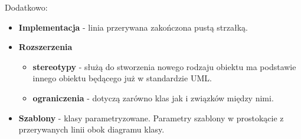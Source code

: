 \documentclass[../main.tex]{subfiles}
\begin{document}
    Dodatkowo:
    \begin{itemize}
        \item \textbf{Implementacja} - linia przerywana
        zakończona pustą strzałką.
        \item \textbf{Rozszerzenia}
        \begin{itemize}
            \item \textbf{stereotypy} - służą do stworzenia nowego rodzaju obiektu ma podstawie innego obiektu
            będącego już w standardzie UML.
            \item \textbf{ograniczenia} - dotyczą zarówno klas jak i związków między nimi.
        \end{itemize}
        \item \textbf{Szablony} - klasy parametryzowane. Parametry szablony w prostokącie z przerywanych linii
        obok diagramu klasy.
    \end{itemize}
\end{document}
